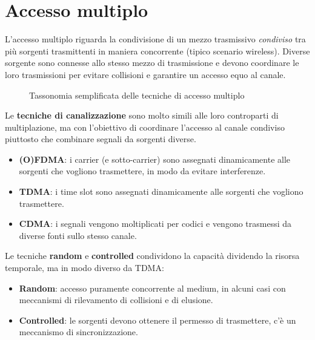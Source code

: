 \section{Accesso multiplo}

L'accesso multiplo riguarda la condivisione di un mezzo trasmissivo \emph{condiviso} tra più sorgenti trasmittenti in maniera concorrente (tipico scenario wireless).
Diverse sorgente sono connesse allo stesso mezzo di trasmissione e devono coordinare le loro trasmissioni per evitare collisioni e garantire un accesso equo al canale.

\begin{figure}[htbp]
\centering
{}
\caption{Tassonomia semplificata delle tecniche di accesso multiplo}
\end{figure}
\noindent
Le \textbf{tecniche di canalizzazione} sono molto simili alle loro controparti di multiplazione, ma con l'obiettivo di coordinare l'accesso al canale condiviso piuttosto che combinare segnali da sorgenti diverse.
\begin{itemize}
	\item \textbf{(O)FDMA}: i carrier (e sotto-carrier) sono assegnati dinamicamente alle sorgenti che vogliono trasmettere, in modo da evitare interferenze.
	\item \textbf{TDMA}: i time slot sono assegnati dinamicamente alle sorgenti che vogliono trasmettere.
	\item \textbf{CDMA}: i segnali vengono moltiplicati per codici e vengono trasmessi da diverse fonti sullo stesso canale.
\end{itemize}
Le tecniche \textbf{random} e \textbf{controlled} condividono la capacità dividendo la risorsa temporale, ma in modo diverso da TDMA:
\begin{itemize}
	\item \textbf{Random}: accesso puramente concorrente al medium, in alcuni casi con meccanismi di rilevamento di collisioni e di elusione.
	\item \textbf{Controlled}: le sorgenti devono ottenere il permesso di trasmettere, c'è un meccanismo di sincronizzazione.
\end{itemize}


